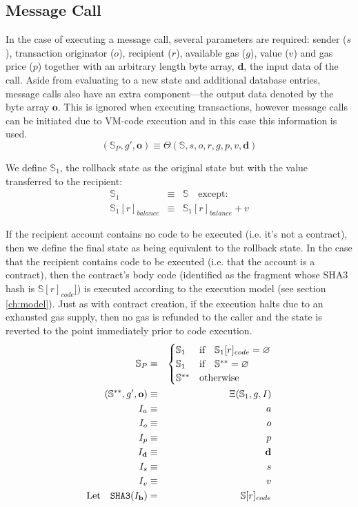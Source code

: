 \documentclass[9pt,oneside]{amsart}
\begin{document}
\begin{multicols}{2}
\section{Message Call} \label{ch:call}

In the case of executing a message call, several parameters are required: sender ($s$), transaction originator ($o$), recipient ($r$), available gas ($g$), value ($v$) and gas price ($p$) together with an arbitrary length byte array, $\mathbf{d}$, the input data of the call. Aside from evaluating to a new state and additional database entries, message calls also have an extra component---the output data denoted by the byte array $\mathbf{o}$. This is ignored when executing transactions, however message calls can be initiated due to VM-code execution and in this case this information is used.
\begin{equation}
(\mathbb{S}_P, g', \mathbf{o}) \equiv \Theta(\mathbb{S}, s, o, r, g, p, v, \mathbf{d})
\end{equation}

We define $\mathbb{S}_1$, the rollback state as the original state but with the value transferred to the recipient:
\begin{eqnarray}
\mathbb{S}_1 & \equiv & \mathbb{S} \quad \text{except:} \\
\mathbb{S}_1[r]_{balance} & \equiv & \mathbb{S}_1[r]_{balance} + v
\end{eqnarray}

If the recipient account contains no code to be executed (i.e. it's not a contract), then we define the final state as being equivalent to the rollback state. In the case that the recipient contains code to be executed (i.e. that the account is a contract), then the contract's body code (identified as the fragment whose SHA3 hash is $\mathbb{S}[r]_{code}]$) is executed according to the execution model (see section \ref{ch:model}). Just as with contract creation, if the execution halts due to an exhausted gas supply, then no gas is refunded to the caller and the state is reverted to the point immediately prior to code execution.
\begin{eqnarray}
\mathbb{S}_P & \equiv & \begin{cases}
\mathbb{S}_1 & \text{if} \quad \mathbb{S}_1[r]_{code} = \varnothing \\
\mathbb{S}_1 & \text{if} \quad \mathbb{S}^{**} = \varnothing \\
\mathbb{S}^{**} & \text{otherwise}
\end{cases} \\
(\mathbb{S}^{**}, g', \mathbf{o}) & \equiv & \Xi(\mathbb{S}_1, g, I) \\
I_a & \equiv & a \\
I_o & \equiv & o \\
I_p & \equiv & p \\
I_\mathbf{d} & \equiv & \mathbf{d} \\
I_s & \equiv & s \\
I_v & \equiv & v \\
\text{Let} \quad \mathtt{\tiny SHA3}(I_\mathbf{b}) & = & \mathbb{S}[r]_{code}
\end{eqnarray}


\end{multicols}
\end{document}
